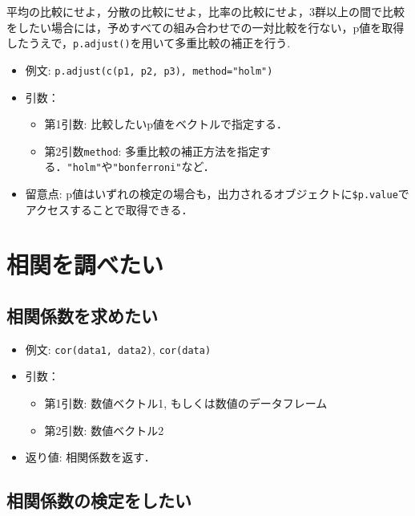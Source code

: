 \documentclass[
  xelatex, ja=standard]{bxjsarticle}
\providecommand{\tightlist}{%
  \setlength{\itemsep}{0pt}\setlength{\parskip}{0pt}}
\begin{document}
平均の比較にせよ，分散の比較にせよ，比率の比較にせよ，3群以上の間で比較をしたい場合には，予めすべての組み合わせでの一対比較を行ない，p値を取得したうえで，\texttt{p.adjust()}を用いて多重比較の補正を行う.

\begin{itemize}
\tightlist
\item
  例文: \texttt{p.adjust(c(p1,\ p2,\ p3),\ method="holm")}
\item
  引数：

  \begin{itemize}
  \tightlist
  \item
    第1引数: 比較したいp値をベクトルで指定する．
  \item
    第2引数\texttt{method}:
    多重比較の補正方法を指定する．\texttt{"holm"}や\texttt{"bonferroni"}など．
  \end{itemize}
\item
  留意点:
  p値はいずれの検定の場合も，出力されるオブジェクトに\texttt{\$p.value}でアクセスすることで取得できる．
\end{itemize}

\section{相関を調べたい}\label{ux76f8ux95a2ux3092ux8abfux3079ux305fux3044}

\subsection{相関係数を求めたい}\label{ux76f8ux95a2ux4fc2ux6570ux3092ux6c42ux3081ux305fux3044}

\begin{itemize}
\tightlist
\item
  例文: \texttt{cor(data1,\ data2)}, \texttt{cor(data)}
\item
  引数：

  \begin{itemize}
  \tightlist
  \item
    第1引数: 数値ベクトル1, もしくは数値のデータフレーム
  \item
    第2引数: 数値ベクトル2
  \end{itemize}
\item
  返り値: 相関係数を返す．
\end{itemize}

\subsection{相関係数の検定をしたい}\label{ux76f8ux95a2ux4fc2ux6570ux306eux691cux5b9aux3092ux3057ux305fux3044}
\end{document}
